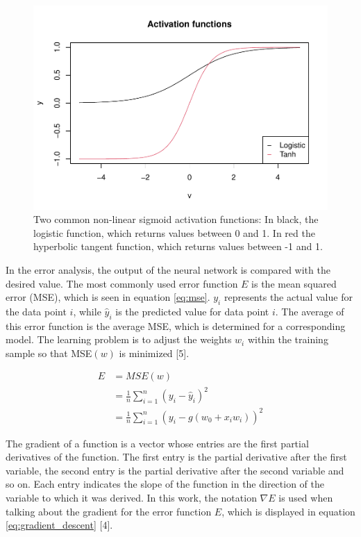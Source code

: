 \documentclass[
]{article}
\begin{document}
\begin{figure}

{\centering \includegraphics[width=0.7\linewidth]{00_main_files/figure-latex/sigmoid-1} 

}

\caption{Two common non-linear sigmoid activation functions: In black, the logistic function, which returns values between 0 and 1. In red the hyperbolic tangent function, which returns values between -1 and 1.}\label{fig:sigmoid}
\end{figure}

In the error analysis, the output of the neural network is compared with
the desired value. The most commonly used error function \(E\) is the
mean squared error (MSE), which is seen in equation \ref{eq:mse}.
\(y_{i}\) represents the actual value for the data point \(i\), while
\(\hat{y}_{i}\) is the predicted value for data point \(i\). The average
of this error function is the average MSE, which is determined for a
corresponding model. The learning problem is to adjust the weights
\(w_{i}\) within the training sample so that MSE\((w)\) is minimized
{[}5{]}.

\begin{align} \label{eq:mse}
  E &=MSE(w) \\
  &=\frac{1}{n}\sum_{i = 1}^{n}(y_{i}-\hat{y}_{i})^2 \nonumber \\
  &=\frac{1}{n}\sum_{i = 1}^{n}(y_{i}-g(w_{0}+x_{i}w_{i}))^2 \nonumber 
\end{align}

The gradient of a function is a vector whose entries are the first
partial derivatives of the function. The first entry is the partial
derivative after the first variable, the second entry is the partial
derivative after the second variable and so on. Each entry indicates the
slope of the function in the direction of the variable to which it was
derived. In this work, the notation \(\nabla{E}\) is used when talking
about the gradient for the error function \(E\), which is displayed in
equation \ref{eq:gradient_descent} {[}4{]}.
\end{document}
